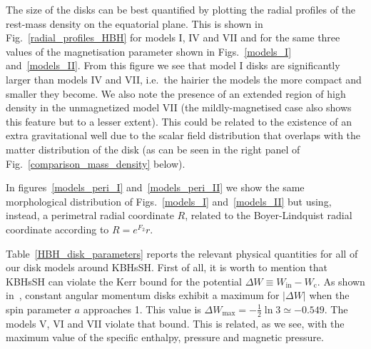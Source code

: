 \documentclass[twocolumn,aps,showpacs,showkeys,prd,superscriptaddress,byrevtex, amsmath]{revtex4-1}
\begin{document}
The size of the disks can be best quantified by plotting the radial profiles of the rest-mass density on the equatorial plane. This is shown in Fig.~\ref{radial_profiles_HBH} for models I, IV and VII and for the same three values of the magnetisation parameter shown in Figs.~\ref{models_I} and~\ref{models_II}. From this figure we see that model I disks are significantly larger than models IV and VII, i.e.~the hairier the models the more compact and smaller they become. We also note the presence of an extended region of high density in the unmagnetized model VII  (the mildly-magnetised case also shows this feature but to a lesser extent). This could be related to the existence of an extra gravitational well due to the scalar field distribution that overlaps with the matter distribution of the disk (as can be seen in the right panel of Fig.~\ref{comparison_mass_density} below).

In figures~\ref{models_peri_I} and~\ref{models_peri_II} we show the same morphological distribution of Figs.~\ref{models_I} and~\ref{models_II} but using, instead, a perimetral radial coordinate $R$, related to the Boyer-Lindquist radial coordinate according to $R = e^{F_2} r$.   

Table~\ref{HBH_disk_parameters} reports the relevant physical quantities for all of our disk models around KBHsSH. First of all, it is worth to mention that KBHsSH can violate the Kerr bound for the potential $\Delta W \equiv W_{\mathrm{in}} - W_{\mathrm{c}}$. As shown in~\cite{Abramowicz:1978}, constant angular momentum disks exhibit a maximum for $|\Delta W|$ when the spin parameter $a$ approaches 1. This value is $\Delta W_{\mathrm{max}} = -\frac{1}{2} \ln 3 \simeq -0.549$. The models V, VI and VII violate that bound. This is related, as we see, with the maximum value of the specific enthalpy, pressure and magnetic pressure. 
\end{document}
